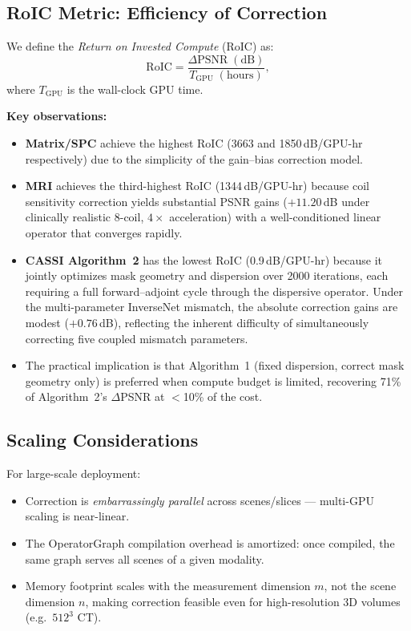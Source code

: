 \documentclass[11pt]{article}
\begin{document}
\subsection{RoIC Metric: Efficiency of Correction}

We define the \emph{Return on Invested Compute} (RoIC) as:
\begin{equation}
  \mathrm{RoIC}
  = \frac{\Delta\mathrm{PSNR}\;(\text{dB})}
         {T_{\mathrm{GPU}}\;(\text{hours})},
\end{equation}
where $T_{\mathrm{GPU}}$ is the wall-clock GPU time.

\noindent\textbf{Key observations:}
\begin{itemize}
  \item \textbf{Matrix/SPC} achieve the highest RoIC (3663 and 1850\,dB/GPU-hr
        respectively) due to the simplicity of the gain--bias correction model.
  \item \textbf{MRI} achieves the third-highest RoIC (1344\,dB/GPU-hr) because coil
        sensitivity correction yields substantial PSNR gains ($+11.20$\,dB under
        clinically realistic 8-coil, $4\times$ acceleration) with a well-conditioned
        linear operator that converges rapidly.
  \item \textbf{CASSI Algorithm~2} has the lowest RoIC (0.9\,dB/GPU-hr)
        because it jointly optimizes mask geometry and dispersion over 2000
        iterations, each requiring a full forward--adjoint cycle through the
        dispersive operator. Under the multi-parameter InverseNet mismatch,
        the absolute correction gains are modest ($+0.76$\,dB), reflecting
        the inherent difficulty of simultaneously correcting five coupled
        mismatch parameters.
  \item The practical implication is that Algorithm~1 (fixed dispersion,
        correct mask geometry only) is preferred when compute budget is
        limited, recovering 71\% of Algorithm~2's $\Delta$PSNR at
        $<$10\% of the cost.
\end{itemize}

\subsection{Scaling Considerations}

For large-scale deployment:
\begin{itemize}
  \item Correction is \emph{embarrassingly parallel} across scenes/slices ---
        multi-GPU scaling is near-linear.
  \item The OperatorGraph compilation overhead is amortized: once compiled,
        the same graph serves all scenes of a given modality.
  \item Memory footprint scales with the measurement dimension $m$, not the
        scene dimension $n$, making correction feasible even for
        high-resolution 3D volumes (e.g.\ $512^3$ CT).
\end{itemize}
\end{document}
